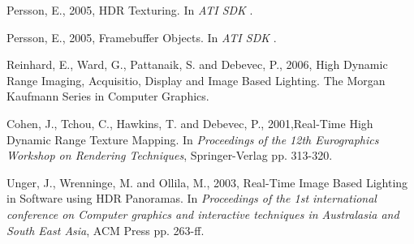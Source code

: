 \documentclass{article}
\begin{document}
\begin{thebibliography}{99}

 Persson, E., 2005, HDR Texturing. In \textit{ATI SDK }.

 Persson, E., 2005, Framebuffer Objects. In \textit{ATI SDK }.

 Reinhard, E., Ward, G., Pattanaik, S. and Debevec, P., 2006, High Dynamic Range Imaging, Acquisitio, Display and Image Based Lighting. The Morgan Kaufmann Series in Computer Graphics.

 Cohen, J., Tchou, C., Hawkins, T. and Debevec, P., 2001,Real-Time High Dynamic Range Texture Mapping. In {\it Proceedings of the 12th Eurographics Workshop on Rendering Techniques}, Springer-Verlag pp. 313-320.

 Unger, J., Wrenninge, M. and Ollila, M., 2003, Real-Time Image Based Lighting in Software using HDR Panoramas. In {\it Proceedings of the 1st international conference on Computer graphics and interactive techniques in Australasia and South East Asia}, ACM Press pp. 263-ff.



\end{thebibliography}
\end{document}
